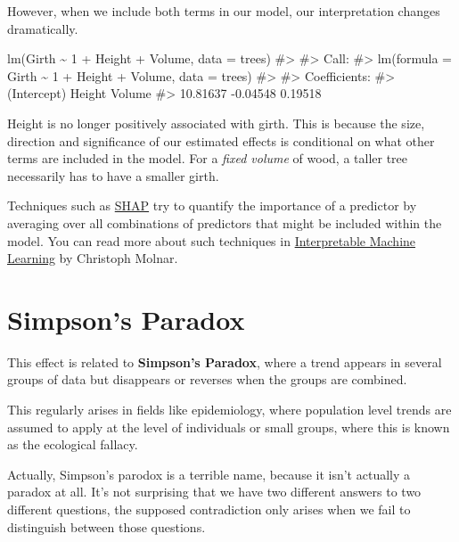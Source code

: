 \documentclass[
  letterpaper,
  DIV=11,
  numbers=noendperiod]{scrreprt}
\newenvironment{Shaded}{\begin{snugshade}}{\end{snugshade}}
\newcommand{\AttributeTok}[1]{\textcolor[rgb]{0.40,0.45,0.13}{#1}}
\newcommand{\CommentTok}[1]{\textcolor[rgb]{0.37,0.37,0.37}{#1}}
\newcommand{\DecValTok}[1]{\textcolor[rgb]{0.68,0.00,0.00}{#1}}
\newcommand{\FunctionTok}[1]{\textcolor[rgb]{0.28,0.35,0.67}{#1}}
\newcommand{\NormalTok}[1]{\textcolor[rgb]{0.00,0.23,0.31}{#1}}
\newcommand{\SpecialCharTok}[1]{\textcolor[rgb]{0.37,0.37,0.37}{#1}}
\begin{document}
However, when we include both terms in our model, our interpretation
changes dramatically.

\begin{Shaded}
\begin{Highlighting}[]
\FunctionTok{lm}\NormalTok{(Girth }\SpecialCharTok{\textasciitilde{}} \DecValTok{1} \SpecialCharTok{+}\NormalTok{ Height }\SpecialCharTok{+}\NormalTok{ Volume, }\AttributeTok{data =}\NormalTok{ trees)}
\CommentTok{\#\textgreater{} }
\CommentTok{\#\textgreater{} Call:}
\CommentTok{\#\textgreater{} lm(formula = Girth \textasciitilde{} 1 + Height + Volume, data = trees)}
\CommentTok{\#\textgreater{} }
\CommentTok{\#\textgreater{} Coefficients:}
\CommentTok{\#\textgreater{} (Intercept)       Height       Volume  }
\CommentTok{\#\textgreater{}    10.81637     {-}0.04548      0.19518}
\end{Highlighting}
\end{Shaded}

Height is no longer positively associated with girth. This is because
the size, direction and significance of our estimated effects is
conditional on what other terms are included in the model. For a
\emph{fixed volume} of wood, a taller tree necessarily has to have a
smaller girth.

Techniques such as
\href{https://christophm.github.io/interpretable-ml-book/shap.html}{SHAP}
try to quantify the importance of a predictor by averaging over all
combinations of predictors that might be included within the model. You
can read more about such techniques in
\href{https://christophm.github.io/interpretable-ml-book/}{Interpretable
Machine Learning} by Christoph Molnar.

\section{Simpson's Paradox}\label{simpsons-paradox}

This effect is related to \textbf{Simpson's Paradox}, where a trend
appears in several groups of data but disappears or reverses when the
groups are combined.

This regularly arises in fields like epidemiology, where population
level trends are assumed to apply at the level of individuals or small
groups, where this is known as the ecological fallacy.

Actually, Simpson's parodox is a terrible name, because it isn't
actually a paradox at all. It's not surprising that we have two
different answers to two different questions, the supposed contradiction
only arises when we fail to distinguish between those questions.
\end{document}
